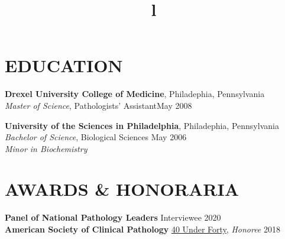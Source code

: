 \documentclass[margin]{res}
\begin{document}
\begin{resume}

\section{EDUCATION}
\textbf{Drexel University College of Medicine}, Philadephia, Pennsylvania\\
{\sl Master of Science}, Pathologists' Assistant\hfill May 2008
\par
\textbf{University of the Sciences in Philadelphia}, Philadephia, Pennsylvania\\
{\sl Bachelor of Science}, Biological Sciences \hfill
May 2006
\\
\emph{Minor in Biochemistry}

\section{AWARDS \& HONORARIA}
\textbf{Panel of National Pathology Leaders} Interviewee \hfill 2020 \\
\textbf{American Society of Clinical Pathology} \underline{40 Under Forty}, \emph{Honoree} \hfill 2018




\begin{format}
\title{l}\\

\\
\\
\body
\end{format}

\end{resume}
\end{document}
